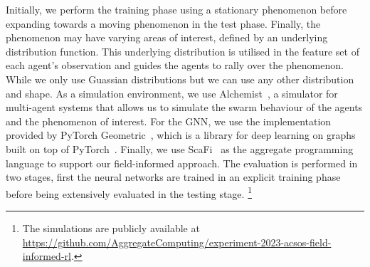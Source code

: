 \documentclass[conference]{IEEEtran}
\begin{document}
Initially, 
  we perform the training phase using a stationary phenomenon before expanding towards a moving phenomenon in the test phase. 
  Finally, the phenomenon may have varying areas of interest, defined by an underlying distribution function. This underlying distribution is utilised in the feature set of each agent's observation and guides the agents to rally over the phenomenon. While we only use Guassian distributions but we can use any other distribution and shape. 
As a simulation environment, we use Alchemist~\cite{alchemist}, 
 a simulator for multi-agent systems that allows us to simulate the swarm behaviour of the agents 
 and the phenomenon of interest.
For the \ac{GNN}, we use the implementation provided by PyTorch Geometric~\cite{Fey/Lenssen/2019}, 
 which is a library for deep learning on graphs built on top of PyTorch~\cite{torch}.
Finally, we use ScaFi~\cite{casadei2022scafi} as the aggregate programming language to support our field-informed approach.
The evaluation is performed in two stages, first the neural networks are trained in an explicit training phase before being extensively evaluated in the testing stage.
\footnote{The simulations are publicly available at \url{https://github.com/AggregateComputing/experiment-2023-acsos-field-informed-rl}.}
\end{document}
